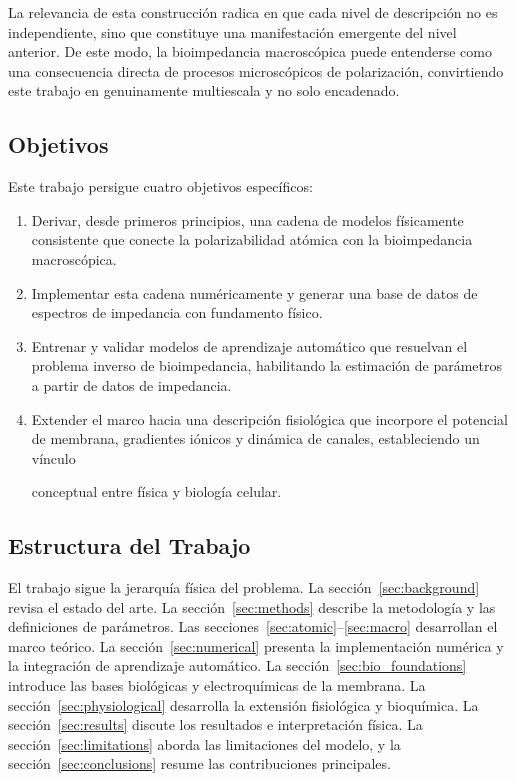 \documentclass[12pt]{article}
\begin{document}
La relevancia de esta construcci\'on radica en que cada nivel de descripci\'on no es
independiente, sino que constituye una manifestaci\'on emergente del nivel anterior.
De este modo, la bioimpedancia macrosc\'opica puede entenderse como una consecuencia
directa de procesos microsc\'opicos de polarizaci\'on, convirtiendo este trabajo en
genuinamente multiescala y no solo encadenado.

\subsection*{Objetivos}

Este trabajo persigue cuatro objetivos espec\'ificos:

\begin{enumerate}
\item Derivar, desde primeros principios, una cadena de modelos f\'isicamente
consistente que conecte la polarizabilidad at\'omica con la bioimpedancia macrosc\'opica.
\item Implementar esta cadena num\'ericamente y generar una base de datos de espectros
de impedancia con fundamento f\'isico.
\item Entrenar y validar modelos de aprendizaje autom\'atico que resuelvan el problema
inverso de bioimpedancia, habilitando la estimaci\'on de par\'ametros a partir de
datos de impedancia.
\item Extender el marco hacia una descripci\'on fisiol\'ogica que incorpore el potencial
de membrana, gradientes i\'onicos y din\'amica de canales, estableciendo un v\'inculo

conceptual entre f\'isica y biolog\'ia celular.
\end{enumerate}

\subsection*{Estructura del Trabajo}

El trabajo sigue la jerarqu\'ia f\'isica del problema.
La secci\'on~\ref{sec:background} revisa el estado del arte.
La secci\'on~\ref{sec:methods} describe la metodolog\'ia y las definiciones de par\'ametros.
Las secciones~\ref{sec:atomic}--\ref{sec:macro} desarrollan el marco te\'orico.
La secci\'on~\ref{sec:numerical} presenta la implementaci\'on num\'erica y la integraci\'on
de aprendizaje autom\'atico.
La secci\'on~\ref{sec:bio_foundations} introduce las bases biol\'ogicas y electroqu\'imicas
de la membrana.
La secci\'on~\ref{sec:physiological} desarrolla la extensi\'on fisiol\'ogica y bioqu\'imica.
La secci\'on~\ref{sec:results} discute los resultados e interpretaci\'on f\'isica.
La secci\'on~\ref{sec:limitations} aborda las limitaciones del modelo, y la
secci\'on~\ref{sec:conclusions} resume las contribuciones principales.
\end{document}
